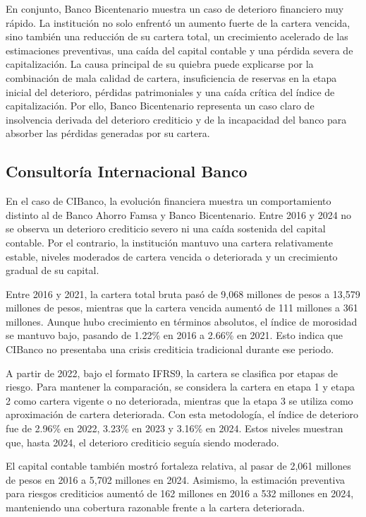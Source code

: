 En conjunto, Banco Bicentenario muestra un caso de deterioro financiero muy rápido. La institución no solo enfrentó un aumento fuerte de la cartera vencida, sino también una reducción de su cartera total, un crecimiento acelerado de las estimaciones preventivas, una caída del capital contable y una pérdida severa de capitalización. La causa principal de su quiebra puede explicarse por la combinación de mala calidad de cartera, insuficiencia de reservas en la etapa inicial del deterioro, pérdidas patrimoniales y una caída crítica del índice de capitalización. Por ello, Banco Bicentenario representa un caso claro de insolvencia derivada del deterioro crediticio y de la incapacidad del banco para absorber las pérdidas generadas por su cartera.

\subsection{Consultoría Internacional Banco}

En el caso de CIBanco, la evolución financiera muestra un comportamiento distinto al de Banco Ahorro Famsa y Banco Bicentenario. Entre 2016 y 2024 no se observa un deterioro crediticio severo ni una caída sostenida del capital contable. Por el contrario, la institución mantuvo una cartera relativamente estable, niveles moderados de cartera vencida o deteriorada y un crecimiento gradual de su capital.

Entre 2016 y 2021, la cartera total bruta pasó de 9,068 millones de pesos a 13,579 millones de pesos, mientras que la cartera vencida aumentó de 111 millones a 361 millones. Aunque hubo crecimiento en términos absolutos, el índice de morosidad se mantuvo bajo, pasando de 1.22\% en 2016 a 2.66\% en 2021. Esto indica que CIBanco no presentaba una crisis crediticia tradicional durante ese periodo.

A partir de 2022, bajo el formato IFRS9, la cartera se clasifica por etapas de riesgo. Para mantener la comparación, se considera la cartera en etapa 1 y etapa 2 como cartera vigente o no deteriorada, mientras que la etapa 3 se utiliza como aproximación de cartera deteriorada. Con esta metodología, el índice de deterioro fue de 2.96\% en 2022, 3.23\% en 2023 y 3.16\% en 2024. Estos niveles muestran que, hasta 2024, el deterioro crediticio seguía siendo moderado.

El capital contable también mostró fortaleza relativa, al pasar de 2,061 millones de pesos en 2016 a 5,702 millones en 2024. Asimismo, la estimación preventiva para riesgos crediticios aumentó de 162 millones en 2016 a 532 millones en 2024, manteniendo una cobertura razonable frente a la cartera deteriorada.

